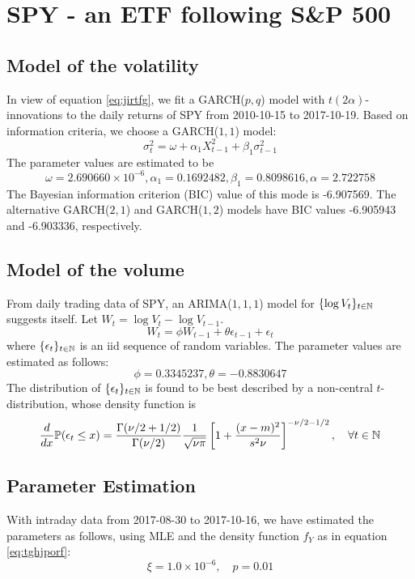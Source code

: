 \section{SPY - an ETF following S\&P 500}
\subsection{Model of the volatility}
In view of equation \eqref{eq:jirtfg}, we fit a GARCH($p, q$) model
with $t(2\alpha)$-innovations to the daily returns of  SPY from
2010-10-15 to 2017-10-19. Based on information criteria, we choose a
GARCH($1, 1$) model:
\[
  \sigma_t^2 = \omega + \alpha_1 X_{t-1}^2 + \beta_1 \sigma_{t-1}^2
\]
The parameter values are estimated to be
\[
  \omega = 2.690660\times 10^{-6}, \alpha_1 = 0.1692482,
  \beta_1 = 0.8098616, \alpha=2.722758
\]
The Bayesian information criterion (BIC) value of this mode is
-6.907569. The alternative GARCH($2,1$) and GARCH($1, 2$) models have
BIC values -6.905943 and -6.903336, respectively.

\subsection{Model of the volume}
From daily trading data of SPY, an ARIMA($1,1,1$) model for
$\{\log V_t\}_{t \in\mathbb N}$ suggests itself. Let $W_t = \log V_t - \log
V_{t-1}$.
\[
  W_t = \phi W_{t-1} + \theta \epsilon_{t-1} + \epsilon_t
\]
where $\{\epsilon_t\}_{t \in \mathbb N}$ is an iid sequence of
random variables. The parameter values are estimated as follows:
\[
  \phi = 0.3345237, \theta = -0.8830647
\]
The distribution of $\{\epsilon_t\}_{t \in \mathbb N}$ is found to be
best described by a non-central $t$-distribution, whose density
function is
\begin{equation}
  \label{eq:h6yhj}
  {d \over dx} \mathbb{P}(\epsilon_t \leq x)
  =
  {\Gamma({\nu/2 + 1/2}) \over \Gamma({\nu/2})}
  {1 \over \sqrt{\nu \pi}}
  \left[
    1 + {(x - m)^2 \over s^2 \nu}
  \right]^{-\nu/2 - 1/2},
  \quad \forall t \in \mathbb N
\end{equation}

\subsection{Parameter Estimation}
With intraday data from 2017-08-30 to 2017-10-16, we have estimated
the parameters as follows, using MLE and the density function $f_Y$ as
in equation \eqref{eq:tghjporf}:
\[
  \xi = 1.0 \times 10^{-6},
  \quad
  p = 0.01
\]

